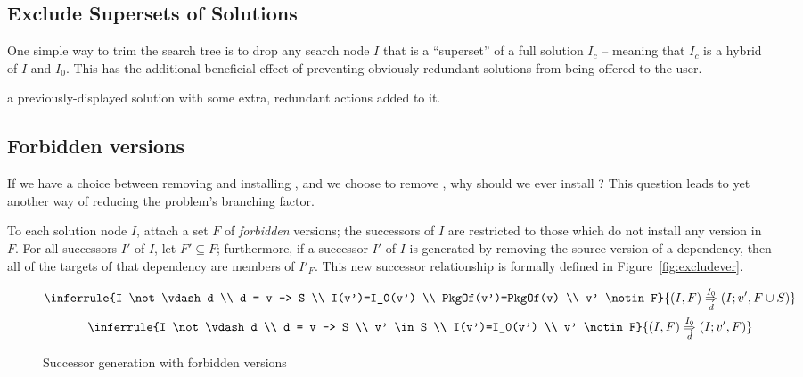 \documentclass[letterpaper]{article}
\theoremstyle{definition}
\theoremstyle{remark}
\newcommand{\pkg}[1]{\text{\url{#1}}}
\newcommand{\pkgof}[1]{PkgOf(#1)}
\newcommand{\nsol}[2]{\overset{#1}{\underset{#2}{\Rightarrow}}}
\newcommand{\satisfies}{\vdash}
\begin{document}
\subsection{Exclude Supersets of Solutions}

One simple way to trim the search tree is to drop any search node $I$
that is a ``superset'' of a full solution $I_c$ -- meaning that $I_c$
is a hybrid of $I$ and $I_0$.  This has the additional beneficial
effect of preventing obviously redundant solutions from being offered
to the user.

a previously-displayed solution with some extra, redundant
actions added to it.

\subsection{Forbidden versions}

If we have a choice between removing \pkg{p} and installing \pkg{q},
and we choose to remove \pkg{p}, why should we ever install \pkg{q}?
This question leads to yet another way of reducing the problem's
branching factor.

To each solution node $I$, attach a set $F$ of \emph{forbidden}
versions; the successors of $I$ are restricted to those which do not
install any version in $F$.  For all successors $I'$ of $I$, let $F'
\subseteq F$; furthermore, if a successor $I'$ of $I$ is generated by
removing the source version of a dependency, then all of the targets
of that dependency are members of $I'_F$.  This new successor
relationship is formally defined in Figure~\vref{fig:excludever}.

\begin{figure}
  \begin{gather*}
    \inferrule{I \not \satisfies d \\ d = v -> S \\
      I(v')=I_0(v') \\ \pkgof{v'}=\pkgof{v} \\ v' \notin F}
    {(I,F) \nsol{I_0}{d} (I;v',F \cup S)} \\
    \inferrule{I \not \satisfies d \\ d = v -> S \\ v' \in S \\
      I(v')=I_0(v') \\ v' \notin F}
    {(I,F) \nsol{I_0}{d} (I;v', F)}
  \end{gather*}

  \caption{Successor generation with forbidden versions}
  \label{fig:excludever}
\end{figure}
\end{document}

